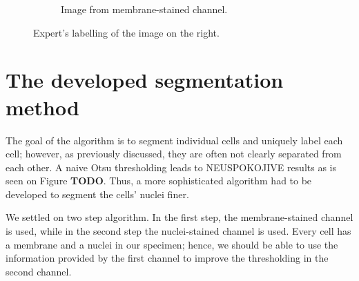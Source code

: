 \documentclass[
  digital,     %
  oneside,     %
  nosansbold,  %
  nocolorbold, %
  lof,         %
  lot,         %
]{fithesis4}
\begin{document}
\begin{figure}
\begin{subfigure}[t]{0.4\textwidth}
        \caption{Image from membrane-stained channel.}
        \label{fig:label_membrane_channel}
    \end{subfigure}
    \hfill
    \caption{Expert's labelling of the image on the right.}
    \label{fig:labelling_example}
\end{figure}


\chapter{The developed segmentation method}


The goal of the algorithm is to segment individual cells and uniquely label each
cell; however, as previously discussed, they are often not clearly separated
from each other. A naive Otsu thresholding leads to NEUSPOKOJIVE results as is
seen on Figure \textbf{TODO}. Thus, a more sophisticated algorithm had to be
developed to segment the cells' nuclei finer.

We settled on two step algorithm. In the first step, the membrane-stained
channel is used, while in the second step the nuclei-stained channel is used.
Every cell has a membrane and a nuclei in our specimen; hence, we should be able
to use the information provided by the first channel to improve the thresholding
in the second channel.
\end{document}
